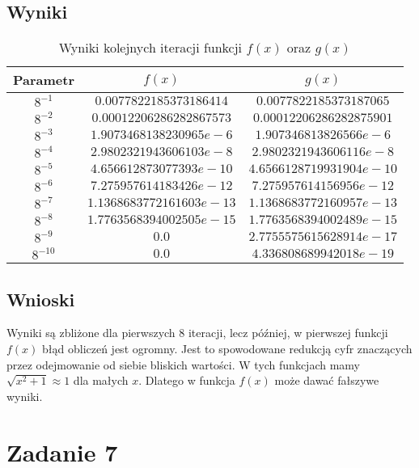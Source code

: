 \documentclass{article}
\begin{document}
        \subsection{Wyniki}
            {\small
            \begin{table}[h!]
            \centering
            \begin{tabular}{c c c}
                \hline
                 Parametr & $f(x)$ & $g(x)$ \\
                 \hline
                $8^{-1}$ & $0.0077822185373186414$ & $0.0077822185373187065$ \\
                $8^{-2}$ & $0.00012206286282867573$ & $0.00012206286282875901$ \\
                $8^{-3}$ & $1.9073468138230965e-6$ & $1.907346813826566e-6$ \\
                $8^{-4}$ & $2.9802321943606103e-8$ & $2.9802321943606116e-8$ \\
                $8^{-5}$ & $4.656612873077393e-10$ & $4.6566128719931904e-10$ \\
                $8^{-6}$ & $7.275957614183426e-12$ & $7.275957614156956e-12$ \\
                $8^{-7}$ & $1.1368683772161603e-13$ & $1.1368683772160957e-13$ \\
                $8^{-8}$ & $1.7763568394002505e-15$ & $1.7763568394002489e-15$ \\
                $8^{-9}$ & $0.0$ & $2.7755575615628914e-17$ \\
                $8^{-10}$ & $0.0$ & $4.336808689942018e-19$ \\
                \hline
            \end{tabular}
            \caption{Wyniki kolejnych iteracji funkcji $f(x)$ oraz $g(x)$}
            \label{table:fgx}
            \end{table}
            }
        \subsection{Wnioski}
            Wyniki są zbliżone dla pierwszych 8 iteracji, lecz później, w pierwszej funkcji $f(x)$ błąd obliczeń jest ogromny. Jest to spowodowane redukcją cyfr znaczących przez odejmowanie od siebie bliskich wartości. W tych funkcjach mamy $\sqrt{x^{2}+1}\approx1$ dla małych $x$. Dlatego w funkcja $f(x)$ może dawać fałszywe wyniki.
            
    \section{Zadanie 7}
\end{document}
